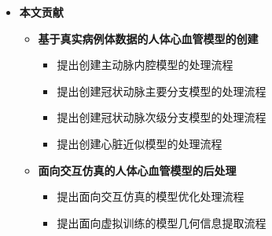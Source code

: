 \begin{frame}
\begin{itemize}
  \item \textbf{本文贡献}
  \begin{itemize}
     \item \textbf{基于真实病例体数据的人体心血管模型的创建}
    \begin{itemize}
       \item 提出创建主动脉内腔模型的处理流程
       \item 提出创建冠状动脉主要分支模型的处理流程
       \item 提出创建冠状动脉次级分支模型的处理流程
       \item 提出创建心脏近似模型的处理流程
    \end{itemize}
     \item \textbf{面向交互仿真的人体心血管模型的后处理}
    \begin{itemize}
       \item 提出面向交互仿真的模型优化处理流程
       \item 提出面向虚拟训练的模型几何信息提取流程
    \end{itemize}
  \end{itemize}
\end{itemize}
\end{frame} 